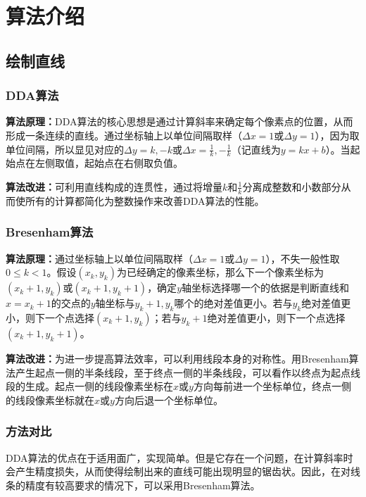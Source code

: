 \documentclass[a4paper,UTF8]{article}
\theoremstyle{definition}
\begin{document}
\section{算法介绍}

\subsection{绘制直线}

\subsubsection{DDA算法}

\textbf{算法原理：}DDA算法的核心思想是通过计算斜率来确定每个像素点的位置，从而形成一条连续的直线。通过坐标轴上以单位间隔取样（$\Delta x = 1$或$\Delta y = 1$），因为取单位间隔，所以显见对应的$\Delta y = k, -k$或$\Delta x = \frac{1}{k},-\frac{1}{k}$（记直线为$y=kx+b$）。当起始点在左侧取值，起始点在右侧取负值。

\textbf{算法改进：}可利用直线构成的连贯性，通过将增量$k$和$\frac{1}{k}$分离成整数和小数部分从而使所有的计算都简化为整数操作来改善DDA算法的性能。

\subsubsection{Bresenham算法}

\textbf{算法原理：}通过坐标轴上以单位间隔取样（$\Delta x = 1$或$\Delta y = 1$），不失一般性取$0\leq k<1$。假设$(x_k,y_k)$为已经确定的像素坐标，那么下一个像素坐标为$(x_{k}+1,y_k)$或$(x_k+1,y_k+1)$，确定$y$轴坐标选择哪一个的依据是判断直线和$x=x_k+1$的交点的$y$轴坐标与$y_k+1,y_k$哪个的绝对差值更小。若与$y_k$绝对差值更小，则下一个点选择$(x_k+1,y_k)$；若与$y_k+1$绝对差值更小，则下一个点选择$(x_k+1,y_k+1)$。

\textbf{算法改进：}为进一步提高算法效率，可以利用线段本身的对称性。用Bresenham算法产生起点一侧的半条线段，至于终点一侧的半条线段，可以看作以终点为起点线段的生成。起点一侧的线段像素坐标在$x$或$y$方向每前进一个坐标单位，终点一侧的线段像素坐标就在$x$或$y$方向后退一个坐标单位。

\subsubsection{方法对比}

DDA算法的优点在于适用面广，实现简单。但是它存在一个问题，在计算斜率时会产生精度损失，从而使得绘制出来的直线可能出现明显的锯齿状。因此，在对线条的精度有较高要求的情况下，可以采用Bresenham算法。
\end{document}
